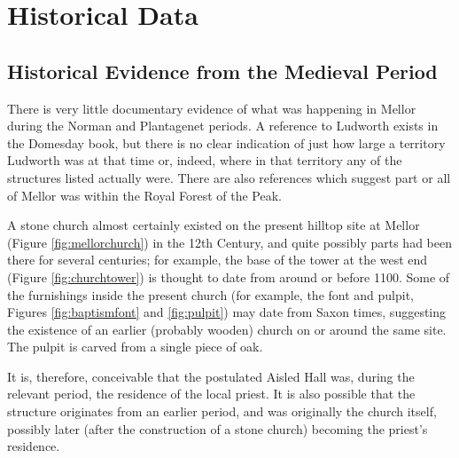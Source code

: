 \documentclass[letterpaper,11pt,titlepage]{article}
\begin{document}
{\section{Historical Data}
\subsection{Historical Evidence from the Medieval Period} 
There is very little documentary evidence of what was happening in Mellor during the Norman and Plantagenet periods. A reference to Ludworth exists in the Domesday book, but there is no clear indication of just how large a territory Ludworth was at that time or, indeed, where in that territory any of the structures listed actually were. There are also references which suggest part or all of Mellor was within the Royal Forest of the Peak. 

A stone church almost certainly existed on the present hilltop site at Mellor (Figure \ref{fig:mellorchurch}) in the 12th Century, and quite possibly parts had been there for several centuries; for example, the base of the tower at the west end (Figure \ref{fig:churchtower}) is thought to date from around or before 1100. Some of the furnishings inside the present church (for example, the font and pulpit, Figures \ref{fig:baptismfont} and \ref{fig:pulpit}) may date from Saxon times, suggesting the existence of an earlier (probably wooden) church on or around the same site. The pulpit is carved from a single piece of oak.

It is, therefore, conceivable that the postulated Aisled Hall was, during the relevant period, the residence of the local priest. It is also possible that the structure originates from an earlier period, and was originally the church itself, possibly later (after the construction of a stone church) becoming the priest's residence.

}
\end{document}

